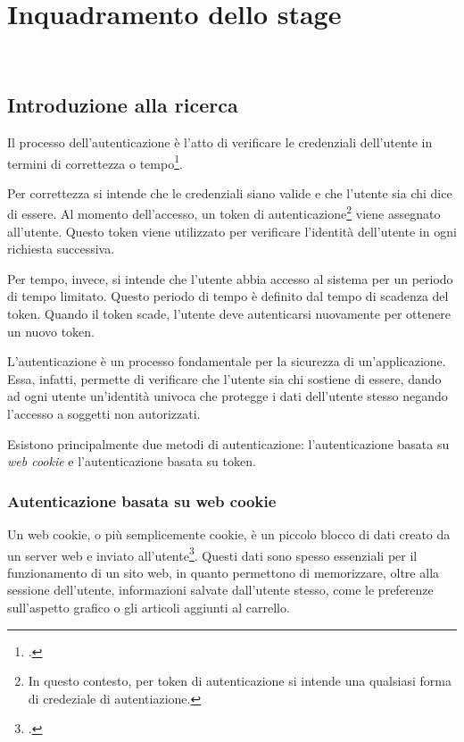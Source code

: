 \chapter{Inquadramento dello stage}
\label{cap:inquadramento-stage}

\\

\section{Introduzione alla ricerca}
Il processo dell'autenticazione è l'atto di verificare le credenziali dell'utente in termini di correttezza o tempo\footcite{site:token-cookie-auth}.

Per correttezza si intende che le credenziali siano valide e che l'utente sia chi dice di essere.
Al momento dell'accesso, un token di autenticazione\footnote{In questo contesto, per token di autenticazione si intende una qualsiasi forma di credeziale di autentiazione.} viene assegnato all'utente.
Questo token viene utilizzato per verificare l'identità dell'utente in ogni richiesta successiva.

Per tempo, invece, si intende che l'utente abbia accesso al sistema per un periodo di tempo limitato.
Questo periodo di tempo è definito dal tempo di scadenza del token.
Quando il token scade, l'utente deve autenticarsi nuovamente per ottenere un nuovo token.

L'autenticazione è un processo fondamentale per la sicurezza di un'applicazione.
Essa, infatti, permette di verificare che l'utente sia chi sostiene di essere, dando ad ogni utente un'identità univoca che protegge i dati dell'utente stesso negando l'accesso a soggetti non autorizzati.

Esistono principalmente due metodi di autenticazione: l'autenticazione basata su \emph{\gls{web cookie}} e l'autenticazione basata su token.

\subsection{Autenticazione basata su web cookie}
Un web cookie, o più semplicemente cookie, è un piccolo blocco di dati creato da un server web e inviato all'utente\footcite{site:cookie-wikipedia}.
Questi dati sono spesso essenziali per il funzionamento di un sito web, in quanto permettono di memorizzare, oltre alla sessione dell'utente, informazioni salvate dall'utente stesso, come le preferenze sull'aspetto grafico o gli articoli aggiunti al carrello.


